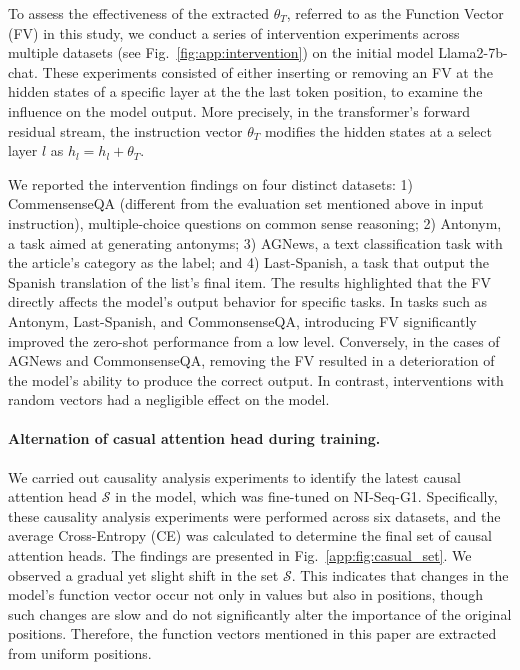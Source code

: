 To assess the effectiveness of the extracted $\theta_T$, referred to as the Function Vector (FV) in this study, we conduct a series of intervention experiments across multiple datasets (see Fig.~\ref{fig:app:intervention}) on the initial model Llama2-7b-chat. These experiments consisted of either inserting or removing an FV at the hidden states of a specific layer at the the last token position, to examine the influence on the model output. More precisely, in the transformer's forward residual stream, the instruction vector $\theta_T$ modifies the hidden states at a select layer $l$ as $h_l = h_l + \theta_T$.





We reported the intervention findings on four distinct datasets: 1) CommensenseQA (different from the evaluation set mentioned above in input instruction), multiple-choice questions on common sense reasoning; 2) Antonym, a task aimed at generating antonyms; 3) AGNews, a text classification task with the article's category as the label; and 4) Last-Spanish, a task that output the Spanish translation of the list's final item. 
The results highlighted that the FV directly affects the model's output behavior for specific tasks. In tasks such as Antonym, Last-Spanish, and CommonsenseQA, introducing FV significantly improved the zero-shot performance from a low level. Conversely, in the cases of AGNews and CommonsenseQA, removing the FV resulted in a deterioration of the model's ability to produce the correct output. In contrast, interventions with random vectors had a negligible effect on the model. 



\paragraph{Alternation of casual attention head during training.}  We carried out causality analysis experiments to identify the latest causal attention head \(\mathcal{S}\) in the model, which was fine-tuned on NI-Seq-G1. Specifically, these causality analysis experiments were performed across six datasets, and the average Cross-Entropy (CE) was calculated to determine the final set of causal attention heads. The findings are presented in Fig.~\ref{app:fig:casual_set}. We observed a gradual yet slight shift in the set \(\mathcal{S}\). This indicates that changes in the model's function vector occur not only in values but also in positions, though such changes are slow and do not significantly alter the importance of the original positions. Therefore, the function vectors mentioned in this paper are extracted from uniform positions.

